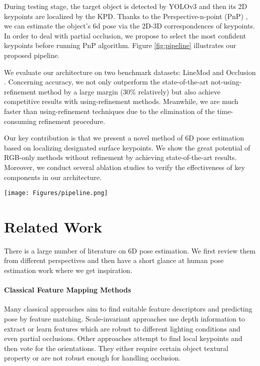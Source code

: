 \documentclass[10pt,twocolumn,letterpaper]{article}
\begin{document}
During testing stage, the target object is detected by YOLOv3 and then its 2D keypoints are localized by the KPD. Thanks to the Perspective-n-point (PnP) \cite{Lepetit2008EPnPAA}, we can estimate the object's 6d pose via the 2D-3D correspondences of keypoints. In order to deal with partial occlusion, we propose to select the most confident keypoints before running PnP algorithm. Figure \ref{fig:pipeline} illustrates our proposed pipeline.

We evaluate our architecture on two benchmark datasets: LineMod \cite{Hinterstoisser:2012:MBT:2481913.2481959} and Occlusion \cite{10.1007/978-3-319-10605-2_35}. Concerning accuracy, we not only outperform the state-of-the-art not-using-refinement method \cite{tekin18} by a large margin (30\% relatively) but also achieve competitive results with using-refinement methods. Meanwhile, we are much faster than using-refinement techniques due to the elimination of the time-consuming refinement procedure.



Our key contribution is that we present a novel method of 6D pose estimation based on localizing designated surface keypoints. We show the great potential of RGB-only methods without refinement by achieving state-of-the-art results. Moreover, we conduct several ablation studies to verify the effectiveness of key components in our architecture.
\begin{figure*}[t]
\begin{center}
   \texttt{[image: Figures/pipeline.png]}
\end{center}
   \caption{Visualization of our proposed pipeline. We first (a) detect bounding box then (b) localize the designated keypoints using keypoint detector (KPD). Finally (c) we use a PnP algorithm to recover the 6D pose.}
\label{fig:pipeline}
\end{figure*}


\section{Related Work}
There is a large number of literature on 6D pose estimation. We first review them from different perspectives and then have a short glance at human pose estimation work where we get inspiration.

\paragraph{Classical Feature Mapping Methods} Many classical approaches aim to find suitable feature descriptors and predicting pose by feature matching. Scale-invariant approaches\cite{10.1007/978-3-319-10605-2_35, 7780759, Kehl2016DeepLO, tejani2014latent} use depth information to extract or learn features which are robust to different lighting conditions and even partial occlusions. Other approaches \cite{5540108, Yi2016LIFTLI, 10.1007/978-3-642-15558-1_26} attempt to find local keypoints and then vote for the orientations. They either require certain object textural property or are not robust enough for handling occlusion.
\end{document}
